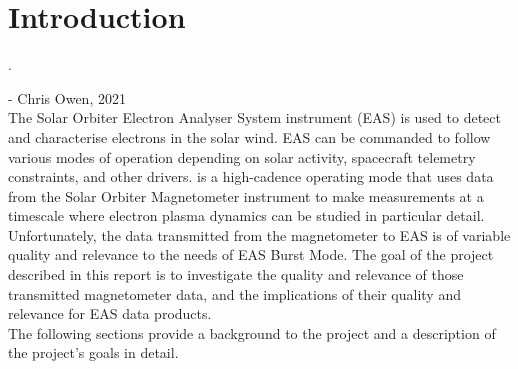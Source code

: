 \chapter{Introduction}
\label{chapterlabel1}

\cite{owen2021}. 

- Chris Owen, 2021
\\

The Solar Orbiter Electron Analyser System instrument (EAS) is used to detect and characterise electrons in the solar wind. EAS can be commanded to follow various modes of operation depending on solar activity, spacecraft telemetry constraints, and other drivers.  is a high-cadence operating mode that uses data from the Solar Orbiter Magnetometer instrument to make measurements at a timescale where electron plasma dynamics can be studied in particular detail. Unfortunately, the data transmitted from the magnetometer to EAS is of variable quality and relevance to the needs of EAS Burst Mode. The goal of the project described in this report is to investigate the quality and relevance of those transmitted magnetometer data, and the implications of their quality and relevance for EAS data products.
\\

The following sections provide a background to the project and a description of the project's goals in detail.
\newpage


